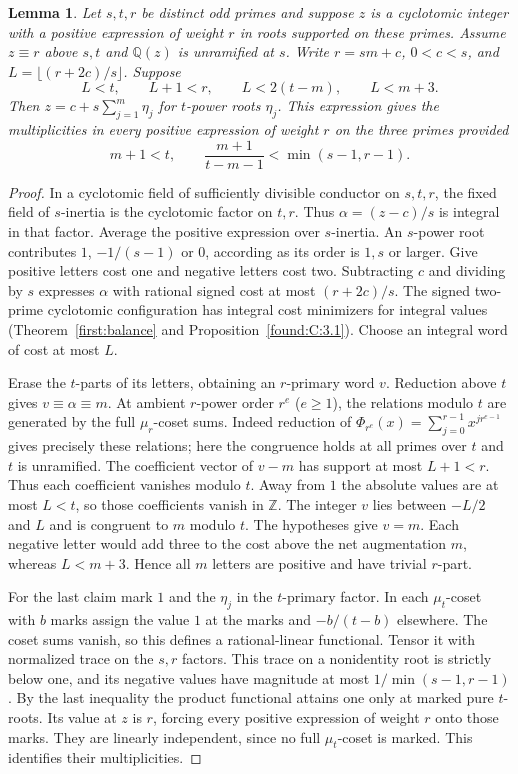 \documentclass[11pt,a4paper]{article}
\numberwithin{equation}{section}
\newtheorem{lemma}[theorem]{Lemma}
\theoremstyle{remark}
\newcommand{\ZZ}{\mathbb Z}
\newcommand{\QQ}{\mathbb Q}
\begin{document}
\begin{lemma}\label{found:D:6.2}\label{found:D:key:lem:unramified-orientation}
Let $s,t,r$ be distinct odd primes and suppose $z$ is a cyclotomic integer with a positive expression of weight $r$ in roots supported on these primes. Assume $z\equiv r$ above $s,t$ and $\QQ(z)$ is unramified at $s$. Write $r=sm+c$, $0<c<s$, and $L=\lfloor(r+2c)/s\rfloor$. Suppose
\[
 L<t,\qquad L+1<r,\qquad L<2(t-m),\qquad L<m+3.
\]
Then $z=c+s\sum_{j=1}^m\eta_j$ for $t$-power roots $\eta_j$. This expression gives the multiplicities in every positive expression of weight $r$ on the three primes provided
\[
 m+1<t,\qquad \frac{m+1}{t-m-1}<\min(s-1,r-1).
\]
\end{lemma}
\begin{proof}
In a cyclotomic field of sufficiently divisible conductor on $s,t,r$, the fixed field of $s$-inertia is the cyclotomic factor on $t,r$. Thus $\alpha=(z-c)/s$ is integral in that factor. Average the positive expression over $s$-inertia. An $s$-power root contributes $1$, $-1/(s-1)$ or $0$, according as its order is $1,s$ or larger. Give positive letters cost one and negative letters cost two. Subtracting $c$ and dividing by $s$ expresses $\alpha$ with rational signed cost at most $(r+2c)/s$. The signed two-prime cyclotomic configuration has integral cost minimizers for integral values (Theorem~\ref{first:balance} and Proposition~\ref{found:C:3.1}). Choose an integral word of cost at most $L$.

Erase the $t$-parts of its letters, obtaining an $r$-primary word $v$. Reduction above $t$ gives $v\equiv\alpha\equiv m$. At ambient $r$-power order $r^e$ ($e\ge1$), the relations modulo $t$ are generated by the full $\mu_r$-coset sums. Indeed reduction of $\Phi_{r^e}(x)=\sum_{j=0}^{r-1}x^{jr^{e-1}}$ gives precisely these relations; here the congruence holds at all primes over $t$ and $t$ is unramified. The coefficient vector of $v-m$ has support at most $L+1<r$. Thus each coefficient vanishes modulo $t$. Away from $1$ the absolute values are at most $L<t$, so those coefficients vanish in $\ZZ$. The integer $v$ lies between $-L/2$ and $L$ and is congruent to $m$ modulo $t$. The hypotheses give $v=m$. Each negative letter would add three to the cost above the net augmentation $m$, whereas $L<m+3$. Hence all $m$ letters are positive and have trivial $r$-part.

For the last claim mark $1$ and the $\eta_j$ in the $t$-primary factor. In each $\mu_t$-coset with $b$ marks assign the value $1$ at the marks and $-b/(t-b)$ elsewhere. The coset sums vanish, so this defines a rational-linear functional. Tensor it with normalized trace on the $s,r$ factors. This trace on a nonidentity root is strictly below one, and its negative values have magnitude at most $1/\min(s-1,r-1)$. By the last inequality the product functional attains one only at marked pure $t$-roots. Its value at $z$ is $r$, forcing every positive expression of weight $r$ onto those marks. They are linearly independent, since no full $\mu_t$-coset is marked. This identifies their multiplicities.
\end{proof}
\end{document}
